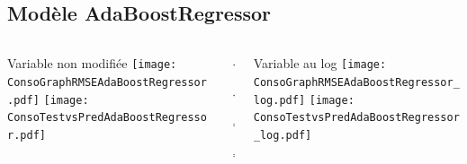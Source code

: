 \documentclass[8pt,aspectratio=169,hyperref={unicode=true}]{beamer}
\begin{document}
\subsection{Modèle AdaBoostRegressor}
\begin{frame}{\insertsubsection}
  \begin{columns}[t]
    \begin{column}{.31\textwidth}
      \centering Variable non modifiée
      \texttt{[image: ConsoGraphRMSEAdaBoostRegressor.pdf]}
      \texttt{[image: ConsoTestvsPredAdaBoostRegressor.pdf]}
    \end{column}
    \begin{column}{.38\textwidth}
      $\Longleftarrow$
      \scriptsize
      {\centering
        }
      

      \normalsize
      $\Longleftarrow$

      \raggedleft $\Longrightarrow$
      \scriptsize
      {\centering
        }
      

      \normalsize
      $\Longrightarrow$
    \end{column}
    \begin{column}{.31\textwidth}
      \centering Variable au log
      \texttt{[image: ConsoGraphRMSEAdaBoostRegressor\_log.pdf]}
      \texttt{[image: ConsoTestvsPredAdaBoostRegressor\_log.pdf]}
    \end{column}
  \end{columns}
\end{frame}
\end{document}
